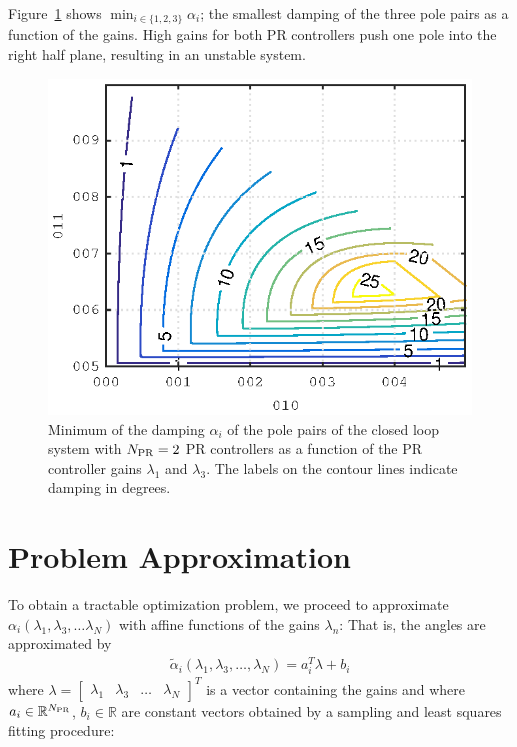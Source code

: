 \documentclass[conference,10pt]{IEEEtran}
\begin{document}
Figure~\ref{fig:DampingExample} shows $\min_{i\in\{1,2,3\}}\alpha_i$; the smallest damping of the three pole pairs as a function of the gains. High gains for both PR controllers push one pole into the right half plane, resulting in an unstable system.
\begin{figure}[!h]
\centering

\includegraphics{fig/root_locus_2D_in_3D}
\caption{Minimum of the damping $\alpha_i$ of the pole pairs of the closed loop system with $N_{\rm PR}=2$ PR controllers as a function of the PR controller gains $\lambda_1$ and $\lambda_3$. The labels on the contour lines indicate damping in degrees.}
\label{fig:DampingExample}
\end{figure}


\section{Problem Approximation}
\label{sec:probapp}
To obtain a tractable optimization problem, we proceed to approximate $\alpha_i(\lambda_1,\lambda_3,\dots\lambda_N)$ with affine functions of the gains $\lambda_n$: That is, the angles are approximated by
\begin{align}
\label{eq:AngleApprox}
\tilde{\alpha}_i(\lambda_1,\lambda_3,\dots, \lambda_N)
= a_i^T\lambda + b_i
\end{align}
where
$\lambda =
\begin{bmatrix}
\lambda_1 & \lambda_3 & \dots & \lambda_N
\end{bmatrix}^T$
is a vector containing the gains and where $a_i\in\mathbb{R}^{N_{\rm PR}}$, $b_i\in\mathbb{R}$ are constant vectors obtained by a sampling and least squares fitting procedure:
\end{document}
